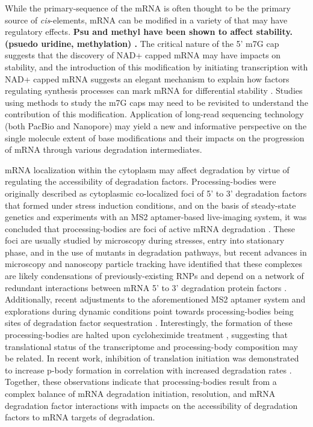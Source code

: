 While the primary-sequence of the mRNA is often thought to be the
primary source of \textit{cis}-elements,
mRNA can be modified in a variety of that may have regulatory effects.
\textbf{Psu and methyl have been shown to affect stability.
(psuedo uridine, methylation)
\parencite{walters2017identification}.}
The critical nature of the 5' m7G cap suggests that the
discovery of NAD+ capped mRNA may have impacts on
stability, and the introduction of this modification by
initiating transcription with NAD+ capped mRNA suggests an
elegant mechanism to explain how factors regulating synthesis 
processes can mark mRNA for differential 
stability \parencite{walters2017identification}.
Studies using methods to study the m7G caps may need to be revisited
to understand the contribution of this modification.
Application of long-read sequencing technology (both PacBio and 
Nanopore) may yield a new and informative perspective on the single
molecule extent of base modifications and their impacts on the
progression of mRNA through various degradation intermediates.

mRNA
localization within the cytoplasm may affect degradation by virtue of
regulating the accessibility of degradation factors. Processing-bodies
were originally described as cytoplasmic co-localized foci of 5' to 3'
degradation factors that formed under stress induction conditions, and
on the basis of steady-state genetics and experiments with an MS2
aptamer-based live-imaging system, it was concluded that
processing-bodies are foci of active mRNA degradation 
\parencite{sheth2003decapping}.
These foci are usually studied by microscopy during
stresses, entry into stationary phase, and in the use of mutants in
degradation pathways, but recent advances in microscopy and nanoscopy
particle tracking have identified that these complexes are likely
condensations of previously-existing RNPs and depend on a network of
redundant interactions between mRNA 5' to 3' degradation protein
factors 
\parencite{lui2014granules,rao2017numerous}.
Additionally, recent
adjustments to the aforementioned MS2 aptamer system and explorations
during dynamic conditions point towards processing-bodies being sites
of degradation factor sequestration 
\parencite{huch2017mrna,tutucci2017improved}.
Interestingly, the formation of these processing-bodies are
halted upon cycloheximide treatment 
\parencite{sheth2003decapping},
suggesting that translational status of the transcriptome and
processing-body composition may be related. In recent work, inhibition
of translation initiation was demonstrated to increase p-body
formation in correlation with increased degradation rates 
\parencite{chan2017non}. 
Together, these observations indicate that processing-bodies
result from a complex balance of mRNA degradation initiation,
resolution, and mRNA degradation factor interactions with impacts on
the accessibility of degradation factors to mRNA targets of
degradation.  

